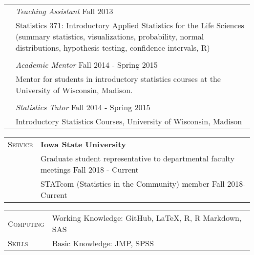 \documentclass[11pt, oneside]{article}
\begin{document}
\begin{longtable}{p{3cm}p{14cm}}
\\
& \emph{Teaching Assistant} \hfill{Fall 2013}\\
& Statistics 371: Introductory Applied Statistics for the Life Sciences (summary statistics, visualizations, probability, normal distributions, hypothesis testing, confidence intervals, R)\\
\\
& \emph{Academic Mentor} \hfill{Fall 2014 - Spring 2015}\\
& Mentor for students in introductory statistics courses at the University of Wisconsin, Madison.\\
\\
& \emph{Statistics Tutor} \hfill{Fall 2014 - Spring 2015}\\
& Introductory Statistics Courses, University of Wisconsin, Madison
\end{longtable}

\vspace{0.5cm}

\noindent 
\begin{tabular}{p{3cm}p{14cm}}
\textsc{Service} & \textbf{Iowa State University} \\
& Graduate student representative to departmental faculty meetings \hfill{Fall 2018 - Current}\\
& STATcom (Statistics in the Community) member \hfill{Fall 2018-Current}\\
\end{tabular}


\vspace{0.5cm}

\noindent
\begin{tabular}{p{3cm}l}
\textsc{Computing} & Working Knowledge: GitHub, LaTeX, R, R Markdown, SAS\\
\textsc{Skills} & Basic Knowledge: JMP, SPSS
\end{tabular}
\end{document}
